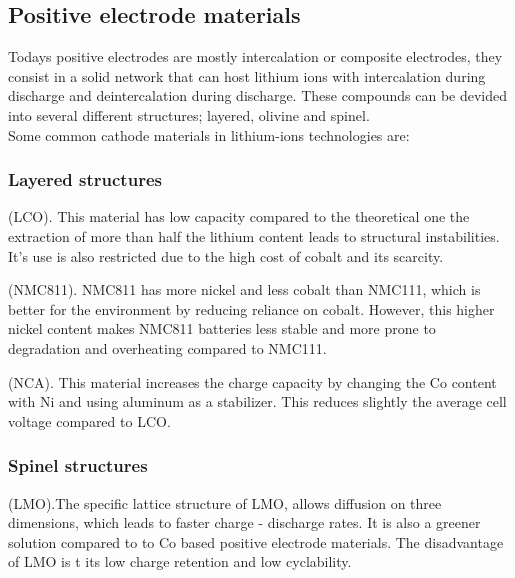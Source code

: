 \documentclass{article}
\begin{document}
{\subsection{Positive electrode materials}

Todays positive electrodes are mostly intercalation or composite electrodes, they consist in a solid network that can host lithium ions with intercalation during discharge and deintercalation during discharge.
These compounds can be devided into several different structures; layered, olivine and spinel. \cite{topo} \\

Some common cathode materials in lithium-ions technologies are:
\begin{description}
 \subsubsection{Layered structures}
  \item[$\text{LiCoO}_{2}$]  (LCO). This material has low capacity compared to the theoretical one the extraction of more than half the lithium content leads to structural instabilities. It's use is also restricted due to the high cost of cobalt and its scarcity. \cite{topo}\cite{LCO}
 
  \item[$ \text{Li(Ni}_{0.8}\text{Co}_{0.1}\text{Mn}_{0.1}\text{)O}_{2} $]  (NMC811). NMC811 has more nickel and less cobalt than NMC111, which is better for the environment by reducing reliance on cobalt. However, this higher nickel content makes NMC811 batteries less stable and more prone to degradation and overheating compared to NMC111.\cite{topo}
  

  \item[$\text{LiNi}_{0.8}\text{Co}_{0.15}\text{Al}_{0.05}\text{O}_{2}$] (NCA).
  This material increases the charge capacity by changing the Co content with Ni and using aluminum as 
  a stabilizer. This reduces slightly the average cell voltage
  compared to LCO.\cite{topo}
\end{description}

\begin{description}
 \subsubsection{Spinel structures}
  \item[$\text{LiMn}_{2}\text{O}_{4}$](LMO).The specific lattice structure
  of LMO, allows diffusion on three dimensions, which leads to faster charge
  - discharge rates. It is also a greener solution compared to to 
  Co based positive electrode materials. The disadvantage of LMO is t
its low charge retention and low cyclability.\cite{topo}
\end{description}

}
\end{document}
